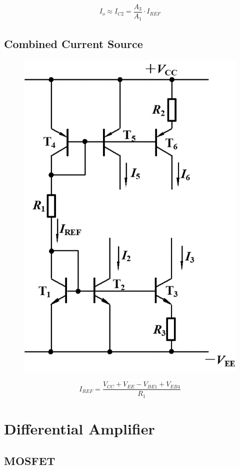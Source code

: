 \begin{equation*}
  \begin{aligned}
    I_o \approx I_{C2} = \dfrac{A_3}{A_1} \cdot I_{REF} 
  \end{aligned}
\end{equation*}

\subsection{Combined Current Source}

\begin{figure}[H]
  \centering
  \includegraphics[width=0.4\linewidth]{figures/BJT-Combined-Current-Source}
  \label{fig:}
\end{figure}

\begin{equation*}
  \begin{aligned}
    I_{REF} = \dfrac{V_{CC} + V_{EE} - V_{BE1} + V_{EB4}}{R_1} 
  \end{aligned}
\end{equation*}

\section{Differential Amplifier}

\subsection{MOSFET}

